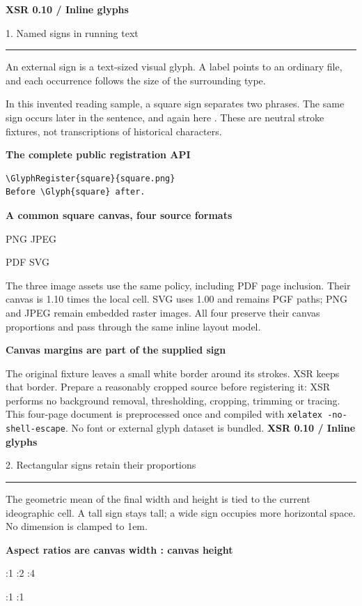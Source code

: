 \documentclass[11pt,a4paper]{article}
\newcommand\PageTitle[1]{{\color{ink}\LARGE\bfseries XSR 0.10 / Inline glyphs}\par
 {\color{accent}\large #1}\par\medskip\hrule\medskip}
\begin{document}
\PageTitle{1. Named signs in running text}
An external sign is a text-sized visual glyph. A label points to an ordinary
file, and each occurrence follows the size of the surrounding type.

In this invented reading sample, a square sign  separates two
phrases. The same sign  occurs later in the sentence, and again
here . These are neutral stroke fixtures, not transcriptions of
historical characters.

\textbf{The complete public registration API}
\begin{verbatim}
\GlyphRegister{square}{square.png}
Before \Glyph{square} after.
\end{verbatim}

\textbf{A common square canvas, four source formats}

{\fontsize{26}{36}\selectfont
PNG \quad JPEG \par
PDF \quad SVG \par}

The three image assets use the same policy, including PDF page inclusion.
Their canvas is 1.10 times the local cell. SVG uses 1.00 and remains PGF paths;
PNG and JPEG remain embedded raster images. All four preserve their canvas
proportions and pass through the same inline layout model.

\textbf{Canvas margins are part of the supplied sign}

The original fixture leaves a small white border around its strokes. XSR keeps
that border. Prepare a reasonably cropped source before registering it: XSR
performs no background removal, thresholding, cropping, trimming or tracing.
\vfill
\small This four-page document is preprocessed once and compiled with
\texttt{xelatex -no-shell-escape}. No font or external glyph dataset is bundled.
\newpage
\PageTitle{2. Rectangular signs retain their proportions}
The geometric mean of the final width and height is tied to the current
ideographic cell. A tall sign stays tall; a wide sign occupies more horizontal
space. No dimension is clamped to 1em.

\textbf{Aspect ratios are canvas width : canvas height}

{\fontsize{24}{32}:1 :2 :4 \par
{}:1 :1 \par}
\end{document}
